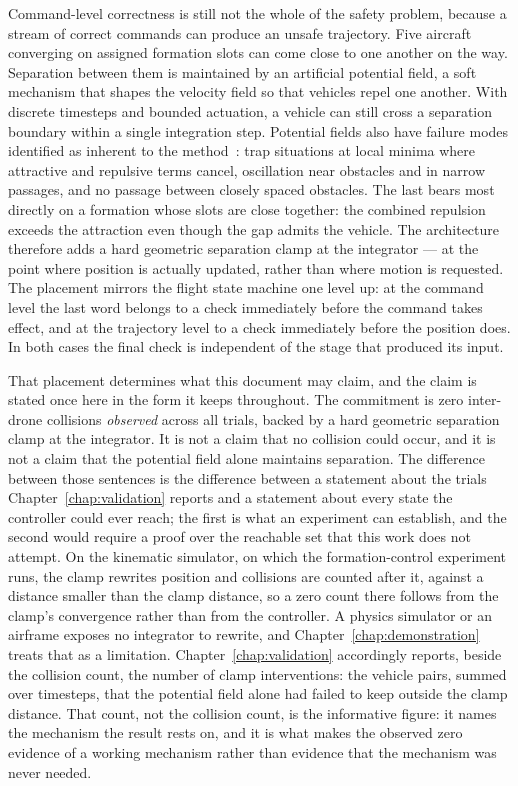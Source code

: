 Command-level correctness is still not the whole of the safety problem, because a stream of
correct commands can produce an unsafe trajectory. Five aircraft converging on assigned formation
slots can come close to one another on the way. Separation between them is maintained by an
artificial
potential field, a soft mechanism that shapes the velocity field so that vehicles repel one
another. With discrete timesteps and bounded actuation, a vehicle can still cross a separation
boundary within a single integration step. Potential fields also have failure modes identified as
inherent to the method~\cite{koren1991}: trap situations at local minima where attractive and
repulsive terms cancel, oscillation near obstacles and in narrow passages, and no passage between
closely spaced obstacles. The last bears most directly on a formation whose slots are close
together: the combined repulsion exceeds the attraction even though the gap admits the vehicle. The
architecture therefore adds a hard geometric separation clamp at the integrator --- at the point
where position is actually updated, rather than where motion is requested. The placement mirrors
the flight state machine one level up: at the command level the last word belongs to a check
immediately before the command takes effect, and at the trajectory level to a check immediately
before the position does. In both cases the final check is independent of the stage that produced
its input.

That placement determines what this document may claim, and the claim is stated once here in the
form it keeps throughout. The commitment is zero inter-drone collisions \emph{observed} across all
trials, backed by a hard geometric separation clamp at the integrator. It is not a claim that no
collision could occur, and it is not a claim that the potential field alone maintains separation.
The difference between those sentences is the difference between a statement about the trials
Chapter~\ref{chap:validation} reports and a statement about every state the controller could ever
reach; the first is what an experiment can establish, and the second would require a proof over
the reachable set that this work does not attempt. On the kinematic simulator, on which the
formation-control experiment runs, the clamp rewrites position and collisions are counted after it,
against a distance smaller than the clamp distance, so a zero count there follows from the clamp's
convergence rather than from the controller. A physics simulator or an airframe exposes no
integrator to rewrite, and Chapter~\ref{chap:demonstration} treats that as a limitation.
Chapter~\ref{chap:validation} accordingly reports, beside the collision count, the number of clamp
interventions: the vehicle pairs, summed over timesteps, that the potential field alone had failed
to keep outside the clamp distance. That count, not the collision count, is the informative figure:
it names the mechanism the result rests on, and it is what makes the observed zero evidence of a
working mechanism rather than evidence that the mechanism was never needed.

